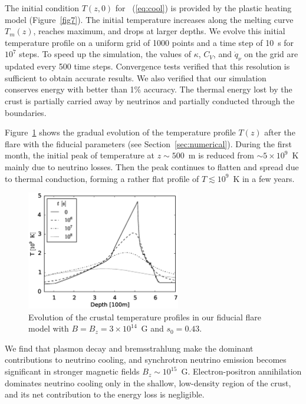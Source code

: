 The initial condition $T(z,0)$ for \Eq~(\ref{eq:cool}) is provided by the plastic heating model (Figure~\ref{fig7}). 
The initial temperature increases along the melting curve $T_m(z)$, reaches maximum, and drops at larger depths. 
We evolve this initial temperature profile on a uniform grid of 1000 points and a time step of 10~s for $10^7$ steps. 
To speed up the simulation, the values of $\kappa$, $C_V$, and $\dot{q}_\nu$ on the grid are updated every 500 time steps.
Convergence tests verified that this resolution is sufficient to obtain accurate results.
We also verified that our simulation conserves energy with better than 1\% accuracy.
The thermal energy lost by the crust is partially carried away by neutrinos and partially conducted through the boundaries.  

Figure~\ref{fig8} shows the gradual evolution of the temperature profile $T(z)$ after the flare with the fiducial parameters (see Section~\ref{sec:numerical}). 
During the first month, the initial peak of temperature at $z\sim 500$~m is reduced from $\sim 5\times 10^9$~K mainly due to neutrino losses. 
Then the peak continues to flatten and spread due to thermal conduction, forming a rather flat profile of $T\lesssim 10^9$~K in a few years.

\begin{figure}[htbp]
\centering
\includegraphics[width=0.6\textwidth]{pics/chap3/fig8.eps} 
\caption[Evolution of the crustal temperature profiles]{Evolution of the crustal temperature profiles in our fiducial flare model with $B=B_z=3\times 10^{14}$~G and $s_0=0.43$.}
\label{fig8}
\end{figure}

We find that plasmon decay and bremsstrahlung make the dominant contributions to neutrino cooling, and synchrotron neutrino emission becomes significant in stronger magnetic fields $B_z\sim 10^{15}$~G. 
Electron-positron annihilation dominates neutrino cooling only in the shallow, low-density region of the crust, and its net contribution to the energy loss is negligible.


